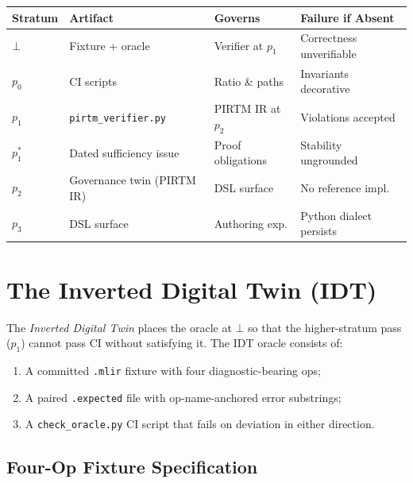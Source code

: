 \documentclass[11pt,letterpaper]{article}
\theoremstyle{pirtmthm}
\theoremstyle{remark}
\begin{document}
\begin{center}
\renewcommand{\arraystretch}{1.3}
\begin{tabular}{@{}>{\bfseries}p{1.3cm}p{3.8cm}p{2.2cm}p{3.5cm}@{}}
  \toprule
  Stratum & Artifact & Governs & Failure if Absent \\
  \midrule
  $\bot$   & Fixture + oracle              & Verifier at $p_1$    & Correctness unverifiable \\
  $p_0$    & CI scripts                    & Ratio \& paths       & Invariants decorative \\
  $p_1$    & \texttt{pirtm\_verifier.py}   & PIRTM IR at $p_2$    & Violations accepted \\
  $p_1^*$  & Dated sufficiency issue       & Proof obligations    & Stability ungrounded \\
  $p_2$    & Governance twin (PIRTM IR)    & DSL surface          & No reference impl. \\
  $p_3$    & DSL surface                   & Authoring exp.       & Python dialect persists \\
  \bottomrule
\end{tabular}
\end{center}

\section{The Inverted Digital Twin (IDT)}

The \emph{Inverted Digital Twin} places the oracle at $\bot$ so that the
higher-stratum pass ($p_1$) cannot pass CI without satisfying it.
The IDT oracle consists of:
\begin{enumerate}[leftmargin=1.8em]
  \item A committed \texttt{.mlir} fixture with four diagnostic-bearing ops;
  \item A paired \texttt{.expected} file with op-name-anchored error substrings;
  \item A \texttt{check\_oracle.py} CI script that fails on deviation in either direction.
\end{enumerate}

\subsection{Four-Op Fixture Specification}
\end{document}
